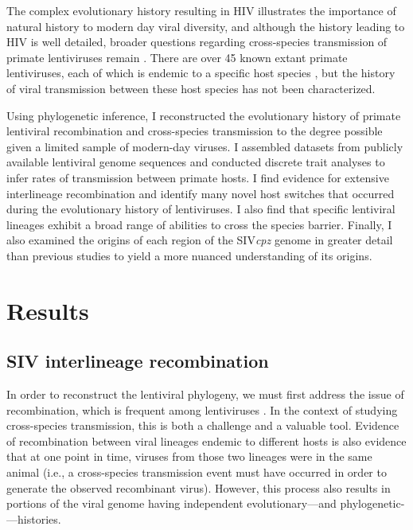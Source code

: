The complex evolutionary history resulting in HIV illustrates the importance of natural history to modern day viral diversity, and although the history leading to HIV is well detailed, broader questions regarding cross-species transmission of primate lentiviruses remain \citep{gifford2012viral}.
There are over 45 known extant primate lentiviruses, each of which is endemic to a specific host species \citep{aghokeng2007full,apetrei2004history,sharp2011origins}, but the history of viral transmission between these host species has not been characterized.

Using phylogenetic inference, I reconstructed the evolutionary history of primate lentiviral recombination and cross-species transmission to the degree possible given a limited sample of modern-day viruses.
I assembled datasets from publicly available lentiviral genome sequences and conducted discrete trait analyses to infer rates of transmission between primate hosts.
I find evidence for extensive interlineage recombination and identify many novel host switches that occurred during the evolutionary history of lentiviruses.
I also find that specific lentiviral lineages exhibit a broad range of abilities to cross the species barrier.
Finally, I also examined the origins of each region of the SIV\textit{cpz} genome in greater detail than previous studies to yield a more nuanced understanding of its origins.
\clearpage


\section{Results}

\subsection{SIV interlineage recombination}
In order to reconstruct the lentiviral phylogeny, we must first address the issue of recombination, which is frequent among lentiviruses \citep{chen2006high}.
In the context of studying cross-species transmission, this is both a challenge and a valuable tool.
Evidence of recombination between viral lineages endemic to different hosts is also evidence that at one point in time, viruses from those two lineages were in the same animal (i.e., a cross-species transmission event must have occurred in order to generate the observed recombinant virus).
However, this process also results in portions of the viral genome having independent evolutionary---and phylogenetic-—histories.

